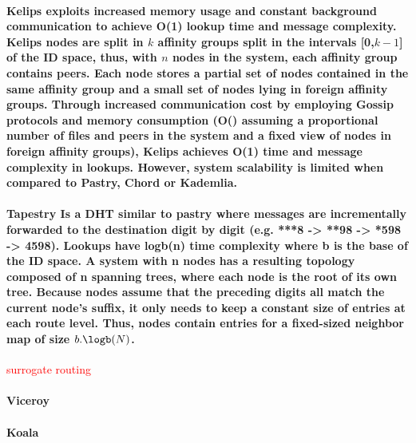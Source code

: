 \paragraph{ \textbf{Kelips} \cite{gupta2003kelips} exploits increased memory usage and constant background communication to achieve O(1) lookup time and message complexity. Kelips nodes are split in $k$ affinity groups split in the intervals [0,$k-1$] of the ID space, thus, with $n$ nodes in the system, each affinity group contains  peers. Each node stores a partial set of nodes contained in the same affinity group and a small set of nodes lying in foreign affinity groups. Through increased communication cost by employing Gossip protocols and memory consumption (O() assuming a proportional number of files and peers in the system and a fixed view of nodes in foreign affinity groups), Kelips achieves O(1) time and message complexity in lookups. However, system scalability is limited when compared to Pastry, Chord or Kademlia. }

\paragraph{ \textbf{Tapestry} \cite{tapestry} Is a DHT similar to pastry where messages are incrementally forwarded to the destination digit by digit (e.g. ***8 -> **98 -> *598 -> 4598). Lookups have logb(n) time complexity where b is the base of the ID space. A system with n nodes has a resulting topology composed of n spanning trees, where each node is the root of its own tree. Because nodes assume that the preceding digits all match the current node's suffix, it only needs to keep a constant size of entries at each route level. Thus, nodes contain entries for a fixed-sized neighbor map of size $b.\logb(N)$. }

\textcolor{red}{surrogate routing}

\paragraph{\textbf{Viceroy} }

\paragraph{\textbf{Koala} }



